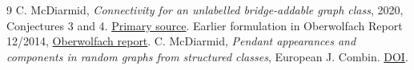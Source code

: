 \documentclass[11pt]{article}
\begin{document}
\begin{thebibliography}{9}
 C. McDiarmid, \emph{Connectivity for an unlabelled bridge-addable graph class}, 2020, Conjectures 3 and 4. \href{https://arxiv.org/abs/2001.05256}{Primary source}. Earlier formulation in Oberwolfach Report 12/2014, \href{https://publications.mfo.de/handle/mfo/3402}{Oberwolfach report}.
 C. McDiarmid, \emph{Pendant appearances and components in random graphs from structured classes}, European J. Combin. \href{https://doi.org/10.1016/j.ejc.2024.103994}{DOI}.
\end{thebibliography}
\end{document}
